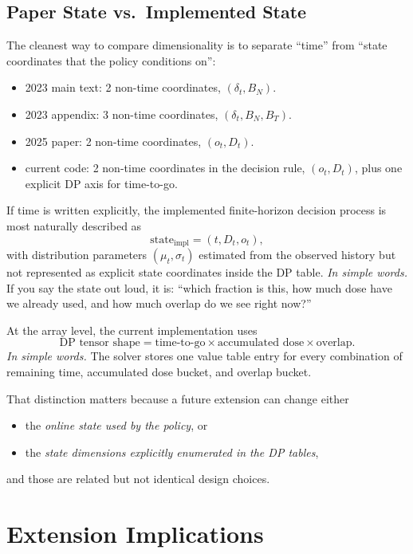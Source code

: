 \documentclass[11pt]{article}
\newcommand{\BN}{B_N}
\newcommand{\BT}{B_T}
\begin{document}
\subsection{Paper State vs.\ Implemented State}

The cleanest way to compare dimensionality is to separate ``time'' from ``state coordinates that the policy conditions on'':
\begin{itemize}
\item 2023 main text: 2 non-time coordinates, $(\delta_t,\BN)$.
\item 2023 appendix: 3 non-time coordinates, $(\delta_t,\BN,\BT)$.
\item 2025 paper: 2 non-time coordinates, $(o_t,D_t)$.
\item current code: 2 non-time coordinates in the decision rule, $(o_t,D_t)$, plus one explicit DP axis for time-to-go.
\end{itemize}

If time is written explicitly, the implemented finite-horizon decision process is most naturally described as
\begin{equation}
\text{state}_{\mathrm{impl}} = (t, D_t, o_t),
\end{equation}
with distribution parameters $(\mu_t,\sigma_t)$ estimated from the observed history but not represented as explicit state coordinates inside the DP table.
\noindent\textit{In simple words.} If you say the state out loud, it is: ``which fraction is this, how much dose have we already used, and how much overlap do we see right now?''

At the array level, the current implementation uses
\begin{equation}
\text{DP tensor shape} = \text{time-to-go} \times \text{accumulated dose} \times \text{overlap}.
\end{equation}
\noindent\textit{In simple words.} The solver stores one value table entry for every combination of remaining time, accumulated dose bucket, and overlap bucket.

That distinction matters because a future extension can change either
\begin{itemize}
\item the \emph{online state used by the policy}, or
\item the \emph{state dimensions explicitly enumerated in the DP tables},
\end{itemize}
and those are related but not identical design choices.

\section{Extension Implications}
\end{document}
